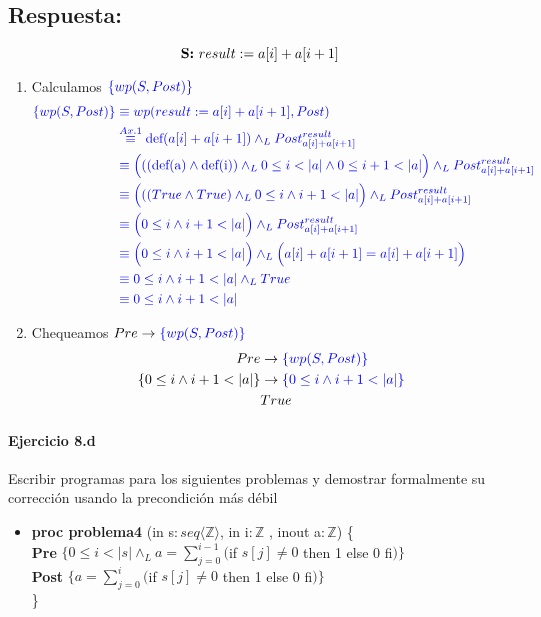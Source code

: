 \documentclass[a4paper]{article}
\begin{document}
\subsection*{Respuesta:}
$$\textbf{S:} \  result := a[i] + a[i + 1]\\$$
\begin{enumerate}

\item Calculamos $\color{blue}\{wp(S,Post)\}$
		\begin{align*}
		\color{blue}\{wp(S,Post)\}
			&\color{blue} \equiv wp(result := a[i] + a[i + 1],Post) \\
			&\color{blue} \stackrel{Ax.1}{\equiv}
			\textrm{def}(a[i] + a[i + 1])\wedge_L Post_{a[i]+a[i+1]}^{result} \\
			&\color{blue} \equiv \Big(((\textrm{def(a)}\wedge
				 \textrm{def(i)})\wedge_L 0\leq i<|a|\wedge0\leq i+1<|a| \Big)
				 	\wedge_L Post_{a[i]+a[i+1]}^{result} \\
			&\color{blue} \equiv \Big(((True\wedge
				 True)\wedge_L 0\leq i\wedge i+1<|a|\Big)\wedge_L Post_{a[i]+a[i+1]}^{result} \\
			&\color{blue} \equiv \Big( 0\leq i\wedge i+1<|a|\Big)\wedge_L
				 Post_{a[i]+a[i+1]}^{result} \\
			&\color{blue} \equiv \Big(0\leq i\wedge i+1<|a|\Big)\wedge_L
				 \Big(a[i] + a[i + 1]=a[i] + a[i + 1]\Big) \\
			&\color{blue} \equiv  0\leq i\wedge i+1<|a|\wedge_L True \\
			&\color{blue} \equiv  0\leq i\wedge i+1<|a| \\		  		
		\end{align*}
\item Chequeamos $Pre \rightarrow \color{blue}\{wp(S,Post)\}$		
		\begin{align*}
		Pre &\rightarrow \color{blue}\{wp(S,Post)\}\\
		\{0 \leq i \wedge i + 1 < |a|\}&\rightarrow \color{blue}\{0\leq i \wedge i+1<|a|\}\\
		& True 
		\end{align*}
\end{enumerate}
\paragraph{Ejercicio 8.d} Escribir programas para los siguientes problemas y demostrar 
formalmente su corrección usando la precondición más débil

\begin{itemize}
\item \textbf{proc problema4 }(in s$: seq\langle \mathbb{Z}\rangle$, in i$:\mathbb{Z}$
	, inout a$: \mathbb{Z}$) \{\smallskip \\                            
    \hspace*{6mm} \textbf{Pre }$\{0 \leq i < |s| \wedge_L a=\sum_{j=0}^{i-1}($if $s[j] \neq 0$ 
    then 1 else 0 fi$)\}$\smallskip \\          
   \hspace*{6mm} \textbf{Post }$\{a=\sum_{j=0}^{i}($if $s[j] \neq 0$ 
    then 1 else 0 fi$)\}$\\
   \}     
\end{itemize}
\end{document}
